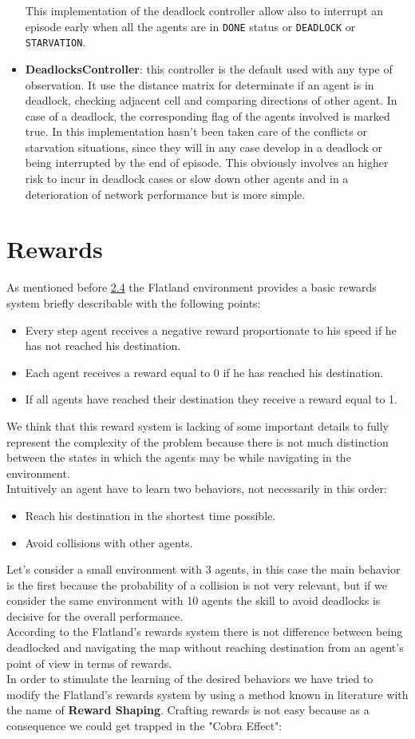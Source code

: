 \begin{itemize}
	This implementation of the deadlock controller allow also to interrupt an episode early when all the agents are in \texttt{DONE} status or \texttt{DEADLOCK} or \texttt{STARVATION}.
	\item \textbf{DeadlocksController}: this controller is the default used with any type of observation. It use the distance matrix for determinate if an agent is in deadlock, checking adjacent cell and comparing directions of other agent. In case of a deadlock, the corresponding flag of the agents involved is marked true. In this implementation hasn't been taken care of the conflicts or starvation situations, since they will in any case develop in a deadlock or being interrupted by the end of episode. This obviously involves an higher risk to incur in deadlock cases or slow down other agents and in a deterioration of network performance but is more simple.
\end{itemize}
\section{Rewards}
As mentioned before \hyperref[sec:envRewards]{2.4} the Flatland environment provides a basic rewards system briefly describable with the following points:
\begin{itemize}
	\item Every step agent receives a negative reward proportionate to his speed if he has not reached his destination.
	\item Each agent receives a reward equal to 0 if he has reached his destination.
	\item If all agents have reached their destination they receive a reward equal to 1.
\end{itemize}
We think that this reward system is lacking of some important details to fully represent the complexity of the problem because there is not much distinction between the states in which the agents may be while navigating in the environment.\\
Intuitively an agent have to learn two behaviors, not necessarily in this order:
\begin{itemize}
	\item Reach his destination in the shortest time possible.
	\item Avoid collisions with other agents.
\end{itemize}
Let's consider a small environment with 3 agents, in this case the main behavior is the first because the probability of a collision is not very relevant, but if we consider the same environment with 10 agents the skill to avoid deadlocks is decisive for the overall performance.\\
According to the Flatland's rewards system there is not difference between being deadlocked and navigating the map without reaching destination from an agent's point of view in terms of rewards. \\
In order to stimulate the learning of the desired behaviors we have tried to modify the Flatland's rewards system by using a method known in literature with the name of \textbf{Reward Shaping}.
Crafting rewards is not easy because as a consequence we could get trapped in the "Cobra Effect":

